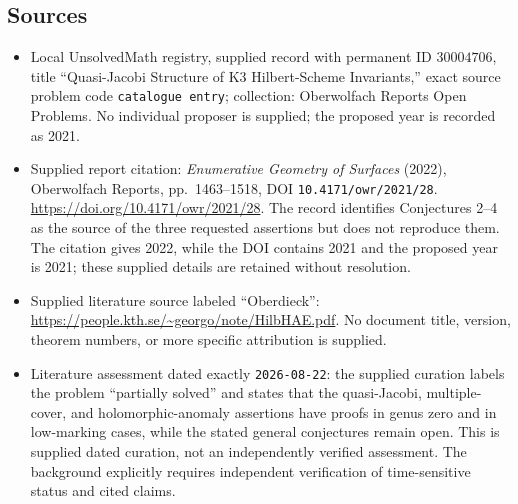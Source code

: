 \documentclass[11pt]{article}
\begin{document}
\subsection{Sources}
\begin{itemize}
\item Local UnsolvedMath registry, supplied record with permanent ID \(30004706\), title ``Quasi-Jacobi Structure of K3 Hilbert-Scheme Invariants,'' exact source problem code \texttt{catalogue entry}; collection: Oberwolfach Reports Open Problems. No individual proposer is supplied; the proposed year is recorded as 2021.
\item Supplied report citation: \emph{Enumerative Geometry of Surfaces} (2022), Oberwolfach Reports, pp.~1463--1518, DOI \texttt{10.4171/owr/2021/28}. \url{https://doi.org/10.4171/owr/2021/28}. The record identifies Conjectures 2--4 as the source of the three requested assertions but does not reproduce them. The citation gives 2022, while the DOI contains 2021 and the proposed year is 2021; these supplied details are retained without resolution.
\item Supplied literature source labeled ``Oberdieck'': \url{https://people.kth.se/~georgo/note/HilbHAE.pdf}. No document title, version, theorem numbers, or more specific attribution is supplied.
\item Literature assessment dated exactly \texttt{2026-08-22}: the supplied curation labels the problem ``partially solved'' and states that the quasi-Jacobi, multiple-cover, and holomorphic-anomaly assertions have proofs in genus zero and in low-marking cases, while the stated general conjectures remain open. This is supplied dated curation, not an independently verified assessment. The background explicitly requires independent verification of time-sensitive status and cited claims.
\end{itemize}
\end{document}

